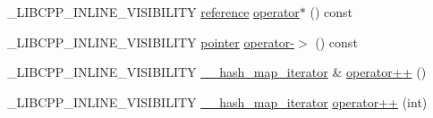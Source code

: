 \begin{DoxyCompactItemize}
\item 
\+\_\+\+L\+I\+B\+C\+P\+P\+\_\+\+I\+N\+L\+I\+N\+E\+\_\+\+V\+I\+S\+I\+B\+I\+L\+I\+T\+Y \hyperlink{class____hash__map__iterator_a61a3f5fd8f3139155d5ceb11d125af3e}{reference} \hyperlink{class____hash__map__iterator_ac19c020c2d4828b1121f839e8291d7e8}{operator$\ast$} () const 
\item 
\+\_\+\+L\+I\+B\+C\+P\+P\+\_\+\+I\+N\+L\+I\+N\+E\+\_\+\+V\+I\+S\+I\+B\+I\+L\+I\+T\+Y \hyperlink{class____hash__map__iterator_a70e6b7226949cef63f92500927ca19a3}{pointer} \hyperlink{class____hash__map__iterator_a9b3fb50f9aa2aaf1681c8fc1858129bc}{operator-\/$>$} () const 
\item 
\+\_\+\+L\+I\+B\+C\+P\+P\+\_\+\+I\+N\+L\+I\+N\+E\+\_\+\+V\+I\+S\+I\+B\+I\+L\+I\+T\+Y \hyperlink{class____hash__map__iterator}{\+\_\+\+\_\+hash\+\_\+map\+\_\+iterator} \& \hyperlink{class____hash__map__iterator_a682b61b1184a2a00861fbcd184b00519}{operator++} ()
\item 
\+\_\+\+L\+I\+B\+C\+P\+P\+\_\+\+I\+N\+L\+I\+N\+E\+\_\+\+V\+I\+S\+I\+B\+I\+L\+I\+T\+Y \hyperlink{class____hash__map__iterator}{\+\_\+\+\_\+hash\+\_\+map\+\_\+iterator} \hyperlink{class____hash__map__iterator_a5c0cda7f7d07af2c7f7e7ce9a4a82572}{operator++} (int)
\end{DoxyCompactItemize}
